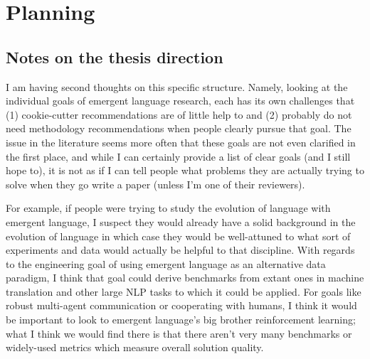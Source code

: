 \setcounter{chapter}{-1}
\chapter{Planning}


\section{Notes on the thesis direction}
I am having second thoughts on this  specific structure.
Namely, looking at the individual goals of emergent language research, each has its own challenges that (1) cookie-cutter recommendations are of little help to and (2) probably do not need methodology recommendations when people clearly pursue that goal.
The issue in the literature seems more often that these goals are not even clarified in the first place, and while I can certainly provide a list of clear goals (and I still hope to), it is not as if I can tell people what problems they are actually trying to solve when they go write a paper (unless I'm one of their reviewers). 

For example, if people were trying to study the evolution of language with emergent language, I suspect they would already have a solid background in the evolution of language in which case they would be well-attuned to what sort of experiments and data would actually be helpful to that discipline.
With regards to the engineering goal of using emergent language as an alternative data paradigm, I think that goal could derive benchmarks from extant ones in machine translation and other large NLP tasks to which it could be applied.
For goals like robust multi-agent communication or cooperating with humans, I think it would be important to look to emergent language's big brother reinforcement learning; what I think we would find there is that there aren't very many benchmarks or widely-used metrics which measure overall solution quality. 

